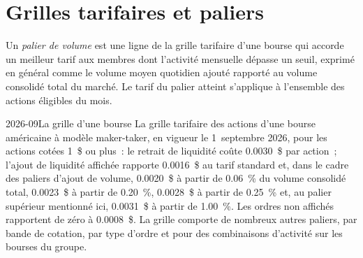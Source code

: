 \section{Grilles tarifaires et paliers}

\begin{definition}\label{def:m1:getting-access-equities:tier}
Un \emph{palier de volume} est une ligne de la grille tarifaire d'une bourse
qui accorde un meilleur tarif aux membres dont l'activité mensuelle dépasse un seuil,
exprimé en général comme le volume moyen quotidien ajouté rapporté au volume consolidé total
du marché. Le tarif du palier atteint
s'applique à l'ensemble des actions éligibles du mois.
\end{definition}

\begin{dated}{2026-09}{La grille d'une bourse}\label{dat:m1:getting-access-equities:bzx}
La grille tarifaire des actions d'une bourse américaine à modèle maker-taker, en vigueur le 1~septembre 2026,
pour les actions cotées 1~\$ ou plus~: le retrait de liquidité coûte 0.0030~\$ par action~; l'ajout de liquidité affichée
rapporte 0.0016~\$ au tarif standard et, dans le cadre des paliers d'ajout de volume, 0.0020~\$ à partir de 0.06~\%
du volume consolidé total, 0.0023~\$ à partir de 0.20~\%, 0.0028~\$ à partir de 0.25~\% et, au palier supérieur
mentionné ici, 0.0031~\$ à partir de 1.00~\%. Les ordres non affichés rapportent de zéro
à 0.0008~\$. La grille comporte de nombreux autres paliers, par bande de cotation,
par type d'ordre et pour des combinaisons d'activité sur
les bourses du groupe.
\end{dated}

\begin{omfigure}

\label{fig:m1:getting-access-equities:tiers}
\end{omfigure}

